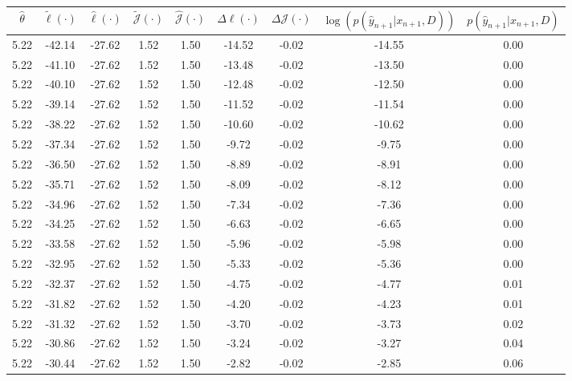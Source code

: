 \begin{table}[htbp]
        \centering
        \tiny
        \begin{adjustbox}{angle=90}
            \begin{tabular}{|c|c|c|c|c|c|c|c|c|}
                \hline
                 $\hat{\theta}$ & $\tilde{\ell}(\cdot)$ & $\hat{\ell}(\cdot)$ & $\tilde{\mathcal{J}}(\cdot)$ & $\hat{\mathcal{J}}(\cdot)$ & $\Delta \ell(\cdot)$ & $\Delta \mathcal{J}(\cdot)$ & $\log(p(\hat{y}_{n+1}|x_{n+1}, D))$ & $p(\hat{y}_{n+1}|x_{n+1}, D)$ \\
                \hline
                 5.22 & -42.14 & -27.62 & 1.52 & 1.50 & -14.52 & -0.02 & -14.55 & 0.00\\ \hline
 5.22 & -41.10 & -27.62 & 1.52 & 1.50 & -13.48 & -0.02 & -13.50 & 0.00\\ \hline
 5.22 & -40.10 & -27.62 & 1.52 & 1.50 & -12.48 & -0.02 & -12.50 & 0.00\\ \hline
 5.22 & -39.14 & -27.62 & 1.52 & 1.50 & -11.52 & -0.02 & -11.54 & 0.00\\ \hline
 5.22 & -38.22 & -27.62 & 1.52 & 1.50 & -10.60 & -0.02 & -10.62 & 0.00\\ \hline
 5.22 & -37.34 & -27.62 & 1.52 & 1.50 & -9.72 & -0.02 & -9.75 & 0.00\\ \hline
 5.22 & -36.50 & -27.62 & 1.52 & 1.50 & -8.89 & -0.02 & -8.91 & 0.00\\ \hline
 5.22 & -35.71 & -27.62 & 1.52 & 1.50 & -8.09 & -0.02 & -8.12 & 0.00\\ \hline
 5.22 & -34.96 & -27.62 & 1.52 & 1.50 & -7.34 & -0.02 & -7.36 & 0.00\\ \hline
 5.22 & -34.25 & -27.62 & 1.52 & 1.50 & -6.63 & -0.02 & -6.65 & 0.00\\ \hline
 5.22 & -33.58 & -27.62 & 1.52 & 1.50 & -5.96 & -0.02 & -5.98 & 0.00\\ \hline
 5.22 & -32.95 & -27.62 & 1.52 & 1.50 & -5.33 & -0.02 & -5.36 & 0.00\\ \hline
 5.22 & -32.37 & -27.62 & 1.52 & 1.50 & -4.75 & -0.02 & -4.77 & 0.01\\ \hline
 5.22 & -31.82 & -27.62 & 1.52 & 1.50 & -4.20 & -0.02 & -4.23 & 0.01\\ \hline
 5.22 & -31.32 & -27.62 & 1.52 & 1.50 & -3.70 & -0.02 & -3.73 & 0.02\\ \hline
 5.22 & -30.86 & -27.62 & 1.52 & 1.50 & -3.24 & -0.02 & -3.27 & 0.04\\ \hline
 5.22 & -30.44 & -27.62 & 1.52 & 1.50 & -2.82 & -0.02 & -2.85 & 0.06\\ \hline

\end{tabular}
\end{adjustbox}
\end{table}
